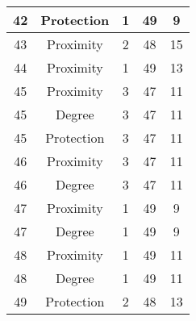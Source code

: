 \documentclass[results.tex]{subfiles}
\begin{document}
\begin{center}
\begin{tabular}{| c || c | c | c | c |}
            \hline
            42                      & Protection                   & 1                      & 49                      & 9                    \\
            \hline
            43                      & Proximity                    & 2                      & 48                      & 15                   \\
            \hline
            44                      & Proximity                    & 1                      & 49                      & 13                   \\
            \hline
            45                      & Proximity                    & 3                      & 47                      & 11                   \\
            \hline
            45                      & Degree                       & 3                      & 47                      & 11                   \\
            \hline
            45                      & Protection                   & 3                      & 47                      & 11                   \\
            \hline
            46                      & Proximity                    & 3                      & 47                      & 11                   \\
            \hline
            46                      & Degree                       & 3                      & 47                      & 11                   \\
            \hline
            47                      & Proximity                    & 1                      & 49                      & 9                    \\
            \hline
            47                      & Degree                       & 1                      & 49                      & 9                    \\
            \hline
            48                      & Proximity                    & 1                      & 49                      & 11                   \\
            \hline
            48                      & Degree                       & 1                      & 49                      & 11                   \\
            \hline
            49                      & Protection                   & 2                      & 48                      & 13                   \\
            \hline
        \end{tabular}
    \end{center}
\end{document}
